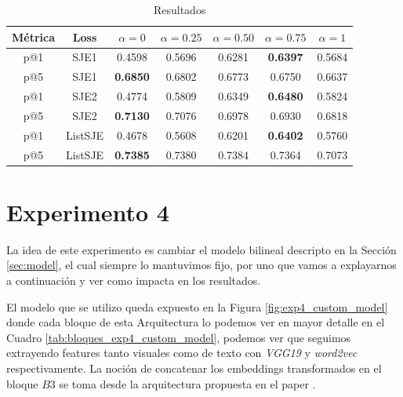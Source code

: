 \begin{table}[ht]
    \centering
    \begin{tabular}{|c|c|c|c|c|c|c|}
        \hline
        \textbf{Métrica} &
        \textbf{Loss} &
        \textbf{$\alpha = 0$} &
        \textbf{$\alpha = 0.25$} &
        \textbf{$\alpha = 0.50$} &
        \textbf{$\alpha = 0.75$} &
        \textbf{$\alpha = 1$}\\
        \hline \hline
        p@1 & SJE1 & 0.4598 & 0.5696 & 0.6281 & \textbf{0.6397} & 0.5684\\
        p@5 & SJE1 & \textbf{0.6850} & 0.6802 & 0.6773 & 0.6750 & 0.6637 \\
        p@1 & SJE2 & 0.4774 & 0.5809 & 0.6349 & \textbf{0.6480} & 0.5824 \\
        p@5 & SJE2 & \textbf{0.7130} & 0.7076 & 0.6978 & 0.6930 & 0.6818 \\
        p@1 & ListSJE & 0.4678 & 0.5608 & 0.6201 & \textbf{0.6402} & 0.5760 \\
        p@5 & ListSJE & \textbf{0.7385} & 0.7380 & 0.7384 & 0.7364 & 0.7073 \\
        \hline
    \end{tabular}
    \caption{Resultados}
    \label{tab:results_exp3_bert_2}
\end{table}


\section{Experimento 4} \label{sec:exp4}
La idea de este experimento es cambiar el modelo bilineal descripto en la Sección \ref{sec:model}, el cual siempre lo mantuvimos fijo, por uno que vamos a explayarnos a continuación y ver como impacta en los resultados.

El modelo que se utilizo queda expuesto en la Figura \ref{fig:exp4_custom_model} donde cada bloque de esta Arquitectura lo podemos ver en mayor detalle en el Cuadro \ref{tab:bloques_exp4_custom_model}, podemos ver que seguimos extrayendo features tanto visuales como de texto con \textit{VGG19} y \textit{word2vec} respectivamente. La noción de concatenar los embeddings transformados en el bloque $B3$ se toma desde la arquitectura propuesta en el paper \cite{DBLP:journals/corr/abs-1812-10546}.

